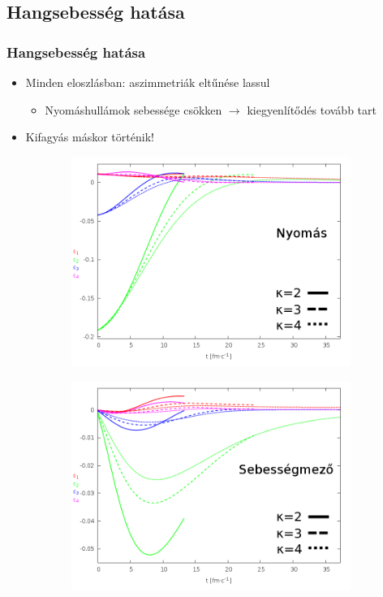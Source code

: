 \documentclass{beamer}
\begin{document}
\subsection{Hangsebesség hatása}
\begin{frame}
\frametitle{Hangsebesség hatása}
\begin{center}
\begin{itemize}
\setlength{\itemsep}{12pt}
\item<1-> Minden eloszlásban: aszimmetriák eltűnése lassul
\vspace{8pt}
\begin{itemize}
\item<1-> Nyomáshullámok sebessége csökken $\rightarrow$ kiegyenlítődés tovább tart
\end{itemize}
\item<1-> Kifagyás máskor történik!
\end{itemize}
\begin{figure}[H]
	\centering
    \begin{subfigure}[b]{0.49\textwidth}
    		\includegraphics[width=\textwidth]{pic/res/rel/eps_kappa_p}
	\end{subfigure}
	\begin{subfigure}[b]{0.49\textwidth}
        	\includegraphics[width=\textwidth]{pic/res/rel/eps_kappa_v}

\end{subfigure}
\end{figure}
\end{center}
\end{frame}
\end{document}
